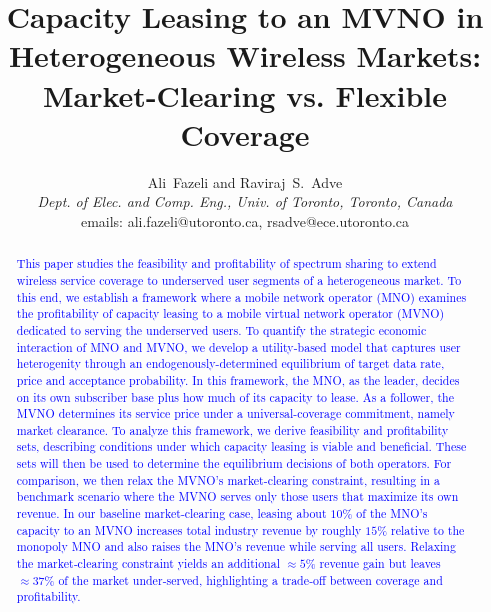 \documentclass[12pt, draftclsnofoot, onecolumn]{IEEEtran}
\begin{document}
	
	\title{Capacity Leasing to an MVNO in Heterogeneous Wireless Markets: Market-Clearing vs. Flexible Coverage}
	
	\author{\hspace{-.1cm}Ali~Fazeli and Raviraj~S.~Adve\\ \textit{Dept. of Elec. and Comp. Eng., Univ. of Toronto, Toronto, Canada}\\ emails: ali.fazeli@utoronto.ca, rsadve@ece.utoronto.ca}
	\maketitle
	\newtheorem{remark}{\textbf{Remark}}
	\newtheorem{lemma}{\textbf{Lemma}}
	\newtheorem{theorem}{\textbf{Theorem}}
	\newtheorem{definition}{\textbf{Definition}}
	\newtheorem{proposition}{\textbf{Proposition}}
	
	\vspace{-2cm}
	\begin{abstract}
		
		\textcolor{blue}{This paper studies the feasibility and profitability of spectrum sharing to extend wireless service coverage to underserved user segments of a heterogeneous market. To this end, we establish a framework where a mobile network operator (MNO) examines the profitability of capacity leasing to a mobile virtual network operator (MVNO) dedicated to serving the underserved users. To quantify the strategic economic interaction of MNO and MVNO, we develop a utility-based model that captures user heterogenity through an endogenously-determined equilibrium of target data rate, price and acceptance probability. In this framework, the MNO, as the leader, decides on its own subscriber base plus how much of its capacity to lease.  As a follower, the MVNO determines its service price under a universal-coverage commitment, namely market clearance. To analyze this framework, we derive feasibility and profitability sets, describing conditions under which capacity leasing is viable and beneficial. These sets will then be used to determine the equilibrium decisions of both operators. For comparison, we then relax the MVNO's market-clearing constraint, resulting in a benchmark scenario where the MVNO serves only those users that maximize its own revenue. In our baseline market‑clearing case, leasing about $10\%$ of the MNO’s capacity to an MVNO increases total industry revenue by roughly $15\%$ relative to the monopoly MNO and also raises the MNO’s revenue while serving all users. Relaxing the market‑clearing constraint yields an additional $\approx5\%$ revenue gain but leaves $\approx37\%$ of the market under‑served, highlighting a trade‑off between coverage and profitability.}
		
		
		
	\end{abstract}
\end{document}
